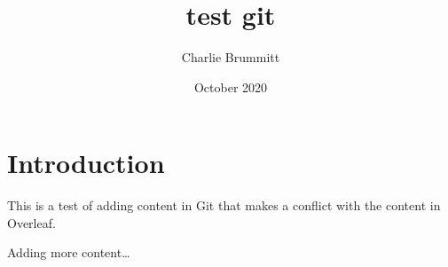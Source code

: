 \documentclass{article}
\title{test git}
\author{Charlie Brummitt}
\date{October 2020}
\begin{document}
\maketitle

\section{Introduction}
This is a test of adding content in Git that makes a conflict with the content in Overleaf.

Adding more content\dots
\end{document}
